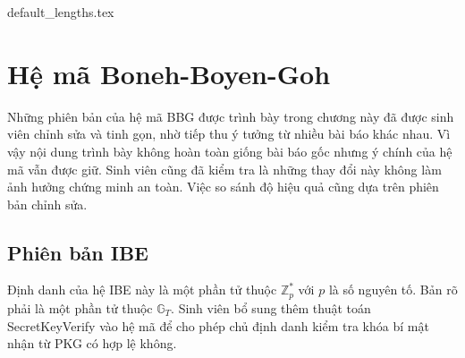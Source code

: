 \documentclass[class=report, crop=false]{standalone}
\begin{document}
	{default_lengths.tex}
	\baselineskip
	\chapter{Hệ mã Boneh-Boyen-Goh}\label{chap:5}
	Những phiên bản của hệ mã BBG được trình bày trong chương này đã được sinh viên chỉnh sửa và tinh gọn, nhờ tiếp thu ý tưởng từ nhiều bài báo khác nhau. Vì vậy nội dung trình bày không hoàn toàn giống bài báo gốc nhưng ý chính của hệ mã vẫn được giữ. Sinh viên cũng đã kiểm tra là những thay đổi này không làm ảnh hưởng chứng minh an toàn. Việc so sánh độ hiệu quả cũng dựa trên phiên bản chỉnh sửa.
	\section{Phiên bản IBE}
		Định danh của hệ IBE này là một phần tử thuộc $\mathbb{Z}_p^*$ với $p$ là số nguyên tố. Bản rõ phải là một phần tử thuộc $\mathbb{G}_T$. Sinh viên bổ sung thêm thuật toán \textsf{SecretKeyVerify} vào hệ mã để cho phép chủ định danh kiểm tra khóa bí mật nhận từ PKG có hợp lệ không.
		\vspace{-0.5\baselineskip}
\end{document}
